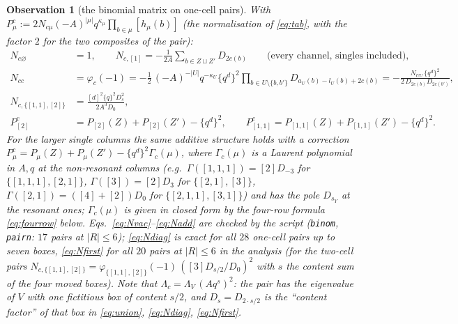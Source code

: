 \documentclass[11pt]{article}
\newtheorem{observation}{Observation}
\newcommand{\Lam}{\Lambda}
\newcommand{\vac}{\varnothing}
\newcommand{\LMPH}[1]{\texttt{#1}}
\begin{document}
\begin{observation}[the binomial matrix on one-cell pairs]\label{obs:Npair}
With $P^c_\mu:=2N_{c\mu}(-A)^{|\mu|}q^{\kappa_\mu}\prod_{b\in\mu}[h_\mu(b)]$ (the normalisation of \eqref{eq:tab}, with the
factor $2$ for the two composites of the pair):
\begin{align}
N_{c\vac}&=1,\qquad N_{c,[1]}=-\frac1{2A}\sum_{b\in Z\sqcup Z'}D_{2c(b)}\qquad\text{(every channel, singles included)},\label{eq:Nvac}\\
N_{cc}&=\varphi_c(-1)=-\frac12\,(-A)^{-|U|}q^{-\kappa_U}\{q^d\}^2\prod_{b\in U\setminus\{b,b'\}}D_{a_U(b)-l_U(b)+2c(b)}
=-\frac{N_{UU}\,\{q^d\}^2}{2\,D_{2c(b)}D_{2c(b')}},\label{eq:Ndiag}\\
N_{c,\{[1,1],[2]\}}&=\frac{[d]^2\{q\}^2D_s^2}{2A^3D_0},\label{eq:Nfirst}\\
P^c_{[2]}&=P_{[2]}(Z)+P_{[2]}(Z')-\{q^d\}^2,\qquad P^c_{[1,1]}=P_{[1,1]}(Z)+P_{[1,1]}(Z')-\{q^d\}^2 .\label{eq:Nadd}
\end{align}
For the larger single columns the same additive structure holds with a correction
$P^c_\mu=P_\mu(Z)+P_\mu(Z')-\{q^d\}^2\Gamma_c(\mu)$, where $\Gamma_c(\mu)$ is a Laurent polynomial in $A,q$ at the
non-resonant columns (e.g.\ $\Gamma([1,1,1])=[2]D_{-3}$ for $\{[1,1,1],[2,1]\}$, $\Gamma([3])=[2]D_3$ for
$\{[2,1],[3]\}$, $\Gamma([2,1])=([4]+[2])D_0$ for $\{[2,1,1],[3,1]\}$) and has the pole $D_{s_Y}$ at the resonant ones;
$\Gamma_c(\mu)$ is given in closed form by the four-row formula \eqref{eq:fourrow} below.  Eqs.\ \eqref{eq:Nvac}--\eqref{eq:Nadd}
are checked by the script (\LMPH{binom}, \LMPH{pairn}: $17$ pairs at $|R|\le6$); \eqref{eq:Ndiag} is exact for all $28$
one-cell pairs up to seven boxes, \eqref{eq:Nfirst} for all $20$ pairs at $|R|\le6$ in the analysis (for the two-cell
pairs $N_{c,\{[1,1],[2]\}}=\varphi_{\{[1,1],[2]\}}(-1)\,([3]D_{s/2}/D_0)^2$ with $s$ the content sum of the four moved boxes).
Note that $\Lam_c=\Lam_V\,(Aq^{s})^2$: the pair has the eigenvalue of $V$ with one fictitious box of content $s/2$, and
$D_s=D_{2\cdot s/2}$ is the ``content factor'' of that box in \eqref{eq:union}, \eqref{eq:Ndiag}, \eqref{eq:Nfirst}.
\end{observation}
\end{document}
